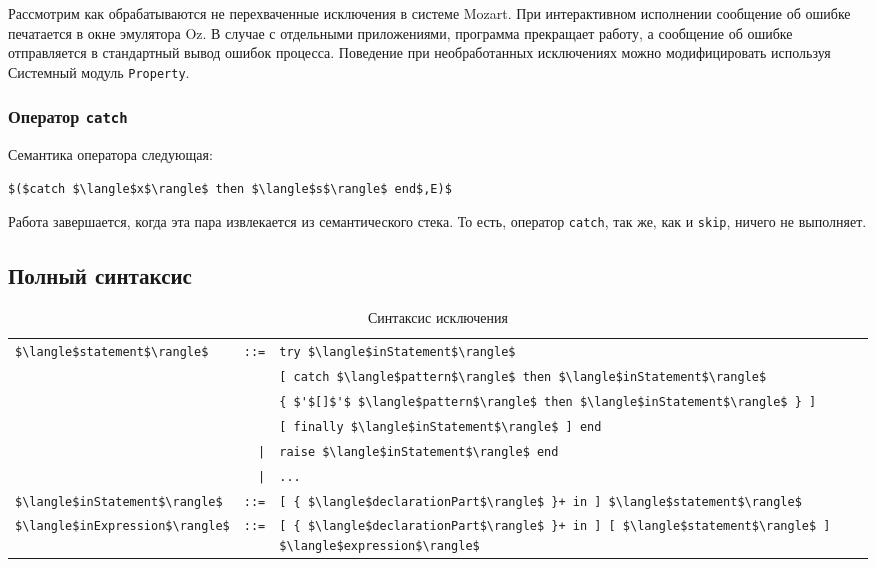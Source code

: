 Рассмотрим как обрабатываются не перехваченные исключения в системе Mozart. При интерактивном исполнении сообщение об ошибке печатается в окне эмулятора Oz. В случае с отдельными приложениями, программа прекращает работу, а сообщение об ошибке отправляется в стандартный вывод ошибок процесса. Поведение при необработанных исключениях можно модифицировать используя Системный модуль \lstinline|Property|.



\subsubsection{Оператор \lstinline|catch|}

Семантика оператора следующая:

\begin{lstlisting}
$($catch $\langle$x$\rangle$ then $\langle$s$\rangle$ end$,E)$
\end{lstlisting}

Работа завершается, когда эта пара извлекается из семантического стека. То есть, оператор \lstinline|catch|, так же, как и \lstinline|skip|, ничего не выполняет.

\subsection{Полный синтаксис}

\begin{table}
  \begin{tabular}{|lrl|}
    \hline
    \lstinline!$\langle$statement$\rangle$! & \lstinline!::=! & \lstinline!try $\langle$inStatement$\rangle$! \\
    & & \lstinline![ catch $\langle$pattern$\rangle$ then $\langle$inStatement$\rangle$! \\
      & & \lstinline!{ $'$[]$'$ $\langle$pattern$\rangle$ then $\langle$inStatement$\rangle$ } ]! \\
    & & \lstinline![ finally $\langle$inStatement$\rangle$ ] end! \\
    & \lstinline!|! & \lstinline!raise $\langle$inStatement$\rangle$ end! \\
    & \lstinline!|! & \lstinline!...! \\
    \lstinline!$\langle$inStatement$\rangle$! & \lstinline!::=! & \lstinline![ { $\langle$declarationPart$\rangle$ }+ in ] $\langle$statement$\rangle$! \\
    \lstinline!$\langle$inExpression$\rangle$! & \lstinline!::=! & \lstinline![ { $\langle$declarationPart$\rangle$ }+ in ] [ $\langle$statement$\rangle$ ] $\langle$expression$\rangle$! \\
    \hline
  \end{tabular}
\caption{Синтаксис исключения}
\label{table:exception_syntax}
\end{table}

